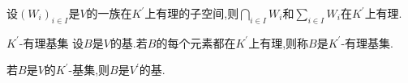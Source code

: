 \begin{corollary}{}{}
	设$\left(W_{i}\right)_{i\in I}$是$V$的一族在$K^{\prime}$上有理的子空间,则$\bigcap\limits_{i\in I}W_{i}$和$\sum\limits_{i\in I}W_{i}$在$K^{\prime}$上有理.
\end{corollary}

\begin{definition}{$K^{\prime}$-有理基集}{}
	设$B$是$V$的基.若$B$的每个元素都在$K^{\prime}$上有理,则称$B$是$K^{\prime}$-有理基集.
\end{definition}

\begin{corollary}{}{}
	若$B$是$V$的$K^{\prime}$-基集,则$B$是$V^{\prime}$的基.
\end{corollary}